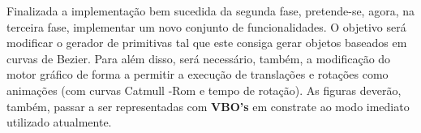 Finalizada a implementação bem sucedida da segunda fase,
pretende-se, agora, na terceira fase, implementar um novo
conjunto de funcionalidades.
\newline
\break
\noindent
O objetivo será modificar o gerador de primitivas tal que
este consiga gerar objetos baseados em curvas de Bezier.
Para além disso, será necessário, também, a modificação
do motor gráfico de forma a permitir a execução de
translações e rotações como animações (com curvas Catmull
-Rom e tempo de rotação). As figuras deverão, também,
passar a ser representadas com \textbf{VBO's} em
constrate ao modo imediato utilizado atualmente.